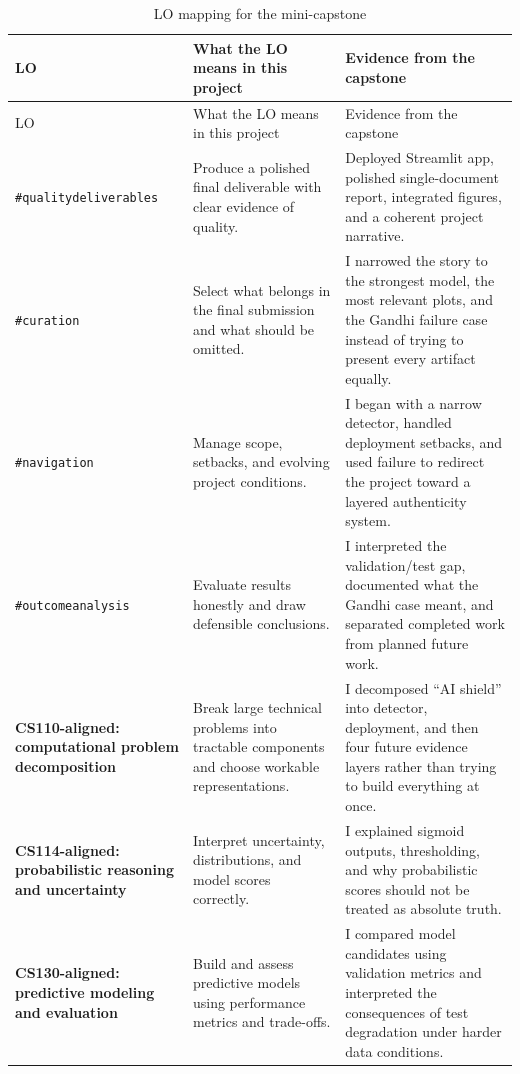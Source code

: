 \documentclass[11pt]{article}
\begin{document}
\begin{longtable}{p{3.1cm}p{4.9cm}p{6.8cm}}
\caption{LO mapping for the mini-capstone}\label{tab:lo-mapping}\\
\toprule
LO & What the LO means in this project & Evidence from the capstone \\
\midrule
\endfirsthead
\toprule
LO & What the LO means in this project & Evidence from the capstone \\
\midrule
\endhead
\texttt{\#qualitydeliverables} & Produce a polished final deliverable with clear evidence of quality. & Deployed Streamlit app, polished single-document report, integrated figures, and a coherent project narrative. \\

\texttt{\#curation} & Select what belongs in the final submission and what should be omitted. & I narrowed the story to the strongest model, the most relevant plots, and the Gandhi failure case instead of trying to present every artifact equally. \\

\texttt{\#navigation} & Manage scope, setbacks, and evolving project conditions. & I began with a narrow detector, handled deployment setbacks, and used failure to redirect the project toward a layered authenticity system. \\

\texttt{\#outcomeanalysis} & Evaluate results honestly and draw defensible conclusions. & I interpreted the validation/test gap, documented what the Gandhi case meant, and separated completed work from planned future work. \\

\textbf{CS110-aligned: computational problem decomposition} & Break large technical problems into tractable components and choose workable representations. & I decomposed ``AI shield'' into detector, deployment, and then four future evidence layers rather than trying to build everything at once. \\

\textbf{CS114-aligned: probabilistic reasoning and uncertainty} & Interpret uncertainty, distributions, and model scores correctly. & I explained sigmoid outputs, thresholding, and why probabilistic scores should not be treated as absolute truth. \\

\textbf{CS130-aligned: predictive modeling and evaluation} & Build and assess predictive models using performance metrics and trade-offs. & I compared model candidates using validation metrics and interpreted the consequences of test degradation under harder data conditions. \\


\end{longtable}
\end{document}
